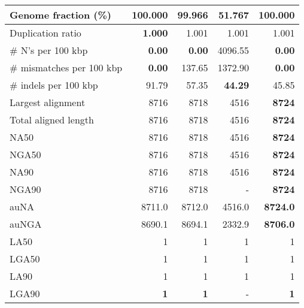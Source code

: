 \documentclass[12pt,a4paper]{article}
\begin{document}
\begin{table}[ht]
\begin{center}
\begin{tabular}{|l*{4}{|r}|}
Genome fraction (\%) & {\bf 100.000} & 99.966 & 51.767 & {\bf 100.000} \\ \hline
Duplication ratio & {\bf 1.000} & 1.001 & 1.001 & 1.001 \\ \hline
\# N's per 100 kbp & {\bf 0.00} & {\bf 0.00} & 4096.55 & {\bf 0.00} \\ \hline
\# mismatches per 100 kbp & {\bf 0.00} & 137.65 & 1372.90 & {\bf 0.00} \\ \hline
\# indels per 100 kbp & 91.79 & 57.35 & {\bf 44.29} & 45.85 \\ \hline
Largest alignment & 8716 & 8718 & 4516 & {\bf 8724} \\ \hline
Total aligned length & 8716 & 8718 & 4516 & {\bf 8724} \\ \hline
NA50 & 8716 & 8718 & 4516 & {\bf 8724} \\ \hline
NGA50 & 8716 & 8718 & 4516 & {\bf 8724} \\ \hline
NA90 & 8716 & 8718 & 4516 & {\bf 8724} \\ \hline
NGA90 & 8716 & 8718 & - & {\bf 8724} \\ \hline
auNA & 8711.0 & 8712.0 & 4516.0 & {\bf 8724.0} \\ \hline
auNGA & 8690.1 & 8694.1 & 2332.9 & {\bf 8706.0} \\ \hline
LA50 & 1 & 1 & 1 & 1 \\ \hline
LGA50 & 1 & 1 & 1 & 1 \\ \hline
LA90 & 1 & 1 & 1 & 1 \\ \hline
LGA90 & {\bf 1} & {\bf 1} & - & {\bf 1} \\ \hline
\end{tabular}
\end{center}
\end{table}
\end{document}
